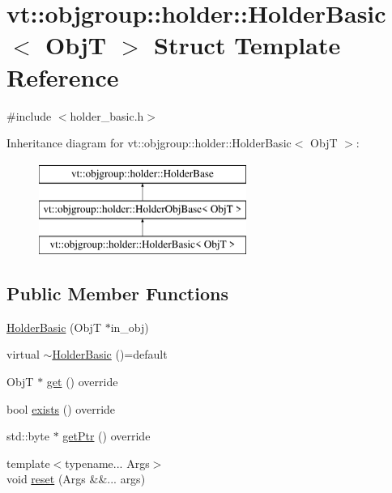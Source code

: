 \hypertarget{structvt_1_1objgroup_1_1holder_1_1_holder_basic}{}\section{vt\+:\+:objgroup\+:\+:holder\+:\+:Holder\+Basic$<$ ObjT $>$ Struct Template Reference}
\label{structvt_1_1objgroup_1_1holder_1_1_holder_basic}


{\ttfamily \#include $<$holder\+\_\+basic.\+h$>$}

Inheritance diagram for vt\+:\+:objgroup\+:\+:holder\+:\+:Holder\+Basic$<$ ObjT $>$\+:\begin{figure}[H]
\begin{center}
\leavevmode
\includegraphics[height=3.000000cm]{structvt_1_1objgroup_1_1holder_1_1_holder_basic}
\end{center}
\end{figure}
\subsection*{Public Member Functions}
\begin{DoxyCompactItemize}
\item 
\hyperlink{structvt_1_1objgroup_1_1holder_1_1_holder_basic_a0e74a9b5eb928c8d9cdaf81dd0994d7b}{Holder\+Basic} (ObjT $\ast$in\+\_\+obj)
\item 
virtual \hyperlink{structvt_1_1objgroup_1_1holder_1_1_holder_basic_a7446aae8de5ccb8e9cceee2143ca29ea}{$\sim$\+Holder\+Basic} ()=default
\item 
ObjT $\ast$ \hyperlink{structvt_1_1objgroup_1_1holder_1_1_holder_basic_af1d605b64e5f9d77d4b291c402133f3f}{get} () override
\item 
bool \hyperlink{structvt_1_1objgroup_1_1holder_1_1_holder_basic_ab52459a275afea84f6650d206fe5b3dc}{exists} () override
\item 
std\+::byte $\ast$ \hyperlink{structvt_1_1objgroup_1_1holder_1_1_holder_basic_a857b56b22964a3524169f6fa30307d65}{get\+Ptr} () override
\item 
{\footnotesize template$<$typename... Args$>$ }\\void \hyperlink{structvt_1_1objgroup_1_1holder_1_1_holder_basic_ae0e03732280c6c1cf44f9ff8f24426c2}{reset} (Args \&\&... args)
\end{DoxyCompactItemize}
